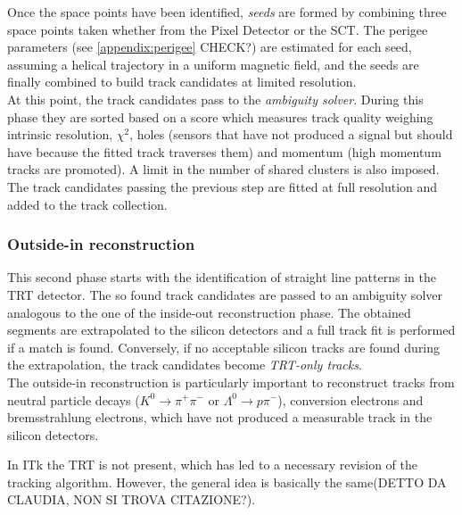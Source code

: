 \documentclass[a4paper,twoside,12pt]{article}
\begin{document}
Once the space points have been identified, \textit{seeds} are formed by combining three space points taken whether from the Pixel Detector or the SCT. The perigee parameters (see \ref{appendix:perigee} CHECK?) are estimated for each seed, assuming a helical trajectory in a 
uniform magnetic field, and the seeds are finally combined to build track candidates at limited resolution.\\

At this point, the track candidates pass to the \textit{ambiguity solver}. During this
phase they are sorted based on a score which measures track quality
weighing intrinsic resolution, $\chi^2$, holes (sensors that have not produced a signal but 
should have because the fitted track traverses them) and momentum (high momentum tracks are 
promoted). A limit in the number of shared clusters is also imposed. \\

The track candidates passing the previous step are fitted at full resolution and added to the track collection.

\subsubsection*{Outside-in reconstruction}
This second phase starts with the identification of straight line patterns in the TRT detector. The so found track candidates are passed to an ambiguity solver analogous to the one of the inside-out reconstruction phase.
The obtained segments are extrapolated to the silicon detectors and a full track fit is performed if a match is found. Conversely, if no acceptable silicon tracks are found during 
the extrapolation, the track candidates become \textit{TRT-only tracks}. \\

The outside-in reconstruction is particularly important to reconstruct tracks from neutral particle decays ($K^0 \rightarrow \pi^+\pi^-$ or $\Lambda^0 \rightarrow p\pi^-$), conversion
electrons and bremsstrahlung electrons, which have not produced a measurable track in the silicon detectors.

\bigskip
\bigskip
\bigskip

In ITk the TRT is not present, which has led to a necessary revision of the tracking algorithm. However, the general idea is basically the same(DETTO DA CLAUDIA, NON SI TROVA CITAZIONE?).
\end{document}

